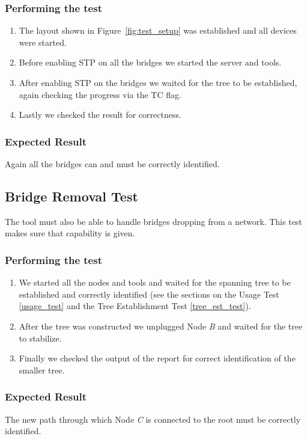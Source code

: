 \subsubsection{Performing the test}
\begin{enumerate}
    \item The layout shown in Figure~\ref{fig:test_setup} was established and all devices were started.
    \item Before enabling STP on all the bridges we started the server and tools.
    \item After enabling STP on the bridges we waited for the tree to be established, again checking the progress via the TC flag.
    \item Lastly we checked the result for correctness.
\end{enumerate}

\subsubsection{Expected Result}
Again all the bridges can and must be correctly identified.

\subsection{Bridge Removal Test}
\label{removal_test}
The tool must also be able to handle bridges dropping from a network.
This test makes sure that capability is given.

\subsubsection{Performing the test}
\begin{enumerate}
    \item We started all the nodes and tools and waited for the spanning tree to be established and correctly identified (see the sections on the Usage Test \ref{usage_test} and the Tree Establishment Test \ref{tree_est_test}).
    \item After the tree was constructed we unplugged Node \textit{B} and waited for the tree to stabilize.
    \item Finally we checked the output of the report for correct identification of the smaller tree.
\end{enumerate}

\subsubsection{Expected Result}
The new path through which Node \textit{C} is connected to the root must be correctly identified.

